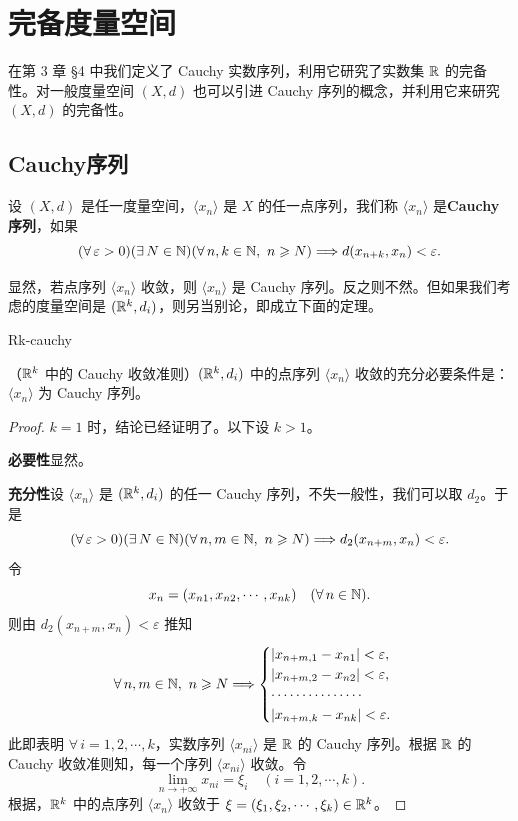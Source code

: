 \section{完备度量空间}

在第 3 章 §4 中我们定义了 Cauchy 实数序列，利用它研究了实数集 $\mathbb{R}$ 的完备性。对一般度量空间 $(X,d)$ 也可以引进 Cauchy 序列的概念，并利用它来研究 $(X,d)$ 的完备性。

\subsection{Cauchy序列}

\begin{mydef*}{}

设 $(X,d)$ 是任一度量空间，$\langle x_n\rangle$ 是 $X$ 的任一点序列，我们称 $\langle x_n\rangle$ 是\textbf{Cauchy 序列}，如果
\[(\forall\,\varepsilon>0)(\exists\,N\in\N)(\forall\,n,k\in\N,\ n\geqslant N)\Longrightarrow d(x_{n+k},x_n)<\varepsilon.\]

\end{mydef*}

显然，若点序列 $\langle x_n\rangle$ 收敛，则 $\langle x_n\rangle$ 是 Cauchy 序列。反之则不然。但如果我们考虑的度量空间是 $(\mathbb{R}^k,d_i)$，则另当别论，即成立下面的定理。

\begin{mythm}{}{Rk-cauchy}

（$\mathbb{R}^k$ 中的 Cauchy 收敛准则）$(\mathbb{R}^k,d_i)$ 中的点序列 $\langle x_n\rangle$ 收敛的充分必要条件是：$\langle x_n\rangle$ 为 Cauchy 序列。

\end{mythm}

\begin{proof}

$k=1$ 时，结论已经证明了。以下设 $k>1$。

\textbf{必要性}\quad 显然。

\textbf{充分性}\quad 设 $\langle x_n\rangle$ 是 $(\mathbb{R}^k,d_i)$ 的任一 Cauchy 序列，不失一般性，我们可以取 $d_2$。于是
\[(\forall\,\varepsilon>0)(\exists\,N\in\N)(\forall\,n,m\in\N,\ n\geqslant N)\Longrightarrow d_2(x_{n+m},x_n)<\varepsilon.\]
令
\[x_n=(x_{n1},x_{n2},\cdots,x_{nk})\quad(\forall\,n\in\mathbb{N}).\]
则由 $d_2(x_{n+m},x_n)<\varepsilon$ 推知
\[\forall\,n,m\in\mathbb{N},\ n\geqslant N\Longrightarrow\begin{cases} |x_{n+m,1}-x_{n1}|<\varepsilon,\\ |x_{n+m,2}-x_{n2}|<\varepsilon,\\ \cdots\cdots\cdots\cdots\cdots\\ |x_{n+m,k}-x_{nk}|<\varepsilon. \end{cases}\]
此即表明 $\forall\,i=1,2,\cdots,k$，实数序列 $\langle x_{ni}\rangle$ 是 $\mathbb{R}$ 的 Cauchy 序列。根据 $\mathbb{R}$ 的 Cauchy 收敛准则知，每一个序列 $\langle x_{ni}\rangle$ 收敛。令
\[\lim_{n\to+\infty}x_{ni}=\xi_i\quad(i=1,2,\cdots,k).\]
根据，$\mathbb{R}^k$ 中的点序列 $\langle x_n\rangle$ 收敛于 $\xi=(\xi_1,\xi_2,\cdots,\xi_k)\in\mathbb{R}^k$。

\end{proof}


